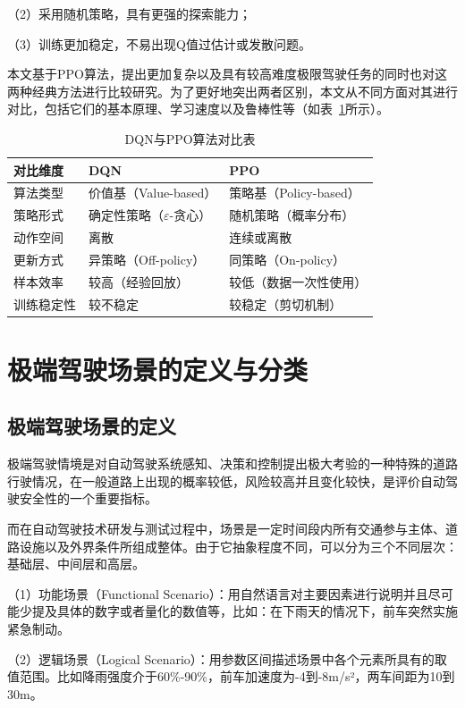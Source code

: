 （2）采用随机策略，具有更强的探索能力；

（3）训练更加稳定，不易出现Q值过估计或发散问题。

本文基于PPO算法，提出更加复杂以及具有较高难度极限驾驶任务的同时也对这两种经典方法进行比较研究。为了更好地突出两者区别，本文从不同方面对其进行对比，包括它们的基本原理、学习速度以及鲁棒性等（如表~\ref{tab:dqn_ppo_compare}所示）\cite{zhang2025deep}。
\begin{table}[htbp]
  \centering
  \caption{DQN与PPO算法对比表}
  \label{tab:dqn_ppo_compare}
  \small
  \begin{tabular}{p{2.5cm}p{4.2cm}p{4.2cm}}
    \toprule
    对比维度 & DQN & PPO \\
    \midrule
    算法类型 & 价值基（Value-based） & 策略基（Policy-based） \\
    策略形式 & 确定性策略（$\varepsilon$-贪心） & 随机策略（概率分布） \\
    动作空间 & 离散 & 连续或离散 \\
    更新方式 & 异策略（Off-policy） & 同策略（On-policy） \\
    样本效率 & 较高（经验回放） & 较低（数据一次性使用） \\
    训练稳定性 & 较不稳定 & 较稳定（剪切机制） \\
    \bottomrule
  \end{tabular}
\end{table}

\section{极端驾驶场景的定义与分类}
\subsection{极端驾驶场景的定义}
极端驾驶情境是对自动驾驶系统感知、决策和控制提出极大考验的一种特殊的道路行驶情况，在一般道路上出现的概率较低，风险较高并且变化较快，是评价自动驾驶安全性的一个重要指标。

而在自动驾驶技术研发与测试过程中，场景是一定时间段内所有交通参与主体、道路设施以及外界条件所组成整体。由于它抽象程度不同，可以分为三个不同层次：基础层、中间层和高层\cite{sun2025autonomous}。

（1）功能场景（Functional Scenario）：用自然语言对主要因素进行说明并且尽可能少提及具体的数字或者量化的数值等，比如：在下雨天的情况下，前车突然实施紧急制动。

（2）逻辑场景（Logical Scenario）：用参数区间描述场景中各个元素所具有的取值范围。比如降雨强度介于60\%-90\%，前车加速度为-4到-8m/s²，两车间距为10到30m。

